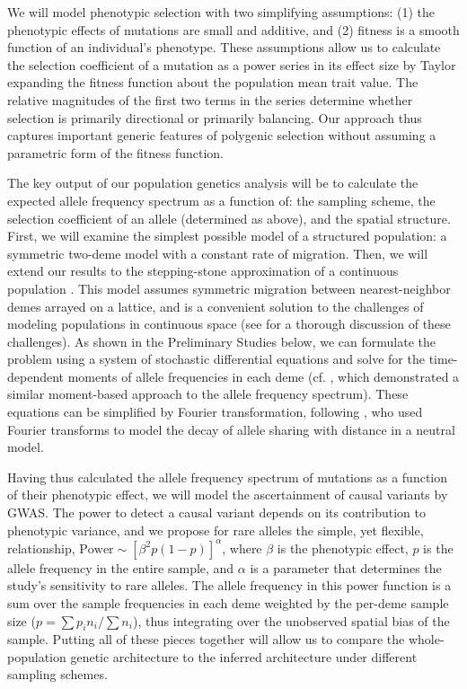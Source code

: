 \documentclass[SpecificAims_and_Proposal]{subfiles}
\begin{document}
We will model phenotypic selection with two simplifying assumptions:
(1) the phenotypic effects of mutations are small and additive, and
(2) fitness is a smooth function of an individual's phenotype.
These assumptions allow us to calculate the selection coefficient of a mutation as a power series in its effect size
by Taylor expanding the fitness function about the population mean trait value.  The relative magnitudes of the first two terms in the series determine whether selection is primarily directional or primarily balancing.  Our approach thus captures important generic features of polygenic selection without assuming a parametric form of the fitness function.

The key output of our population genetics analysis will be to calculate the expected allele frequency spectrum as a function of: the sampling scheme, the selection coefficient of an allele (determined as above), and the spatial structure. First, we will examine the simplest possible model of a structured population:
a symmetric two-deme model with a constant rate of migration.
Then, we will extend our results to the stepping-stone approximation of a continuous population \cite{Kimura1964, Malecot1975}.
This model assumes symmetric migration between nearest-neighbor demes arrayed on a lattice,
and is a convenient solution to the challenges of modeling populations in continuous space (see \citet{Barton2013} for a thorough discussion of these challenges).
As shown in the Preliminary Studies below, we can formulate the problem using a system of stochastic differential equations and solve for the time-dependent moments of allele frequencies in each deme (cf. \cite{Jouganous2017}, which demonstrated a similar moment-based approach to the allele frequency spectrum). These equations can be simplified by Fourier transformation, following \cite{Malecot1975}, who used Fourier transforms to model the decay of allele sharing with distance in a neutral model.

Having thus calculated the allele frequency spectrum of mutations as a function of their phenotypic effect, we will model the ascertainment of causal variants by GWAS.
The power to detect a causal variant depends on its contribution to phenotypic variance,
and we propose for rare alleles the simple, yet flexible, relationship,
$\text{Power} \sim \left[\beta^2 p(1-p) \right]^\alpha$,
where $\beta$ is the phenotypic effect, $p$ is the allele frequency in the entire sample,
and $\alpha$ is a parameter that determines the study's sensitivity to rare alleles.
The allele frequency in this power function is a sum over the sample frequencies in each deme weighted by the per-deme sample size ($p=\sum p_i n_i / \sum n_i$), thus integrating over the unobserved spatial bias of the sample. Putting all of these pieces together will allow us to compare the whole-population genetic architecture to the inferred architecture under different sampling schemes.
\end{document}
